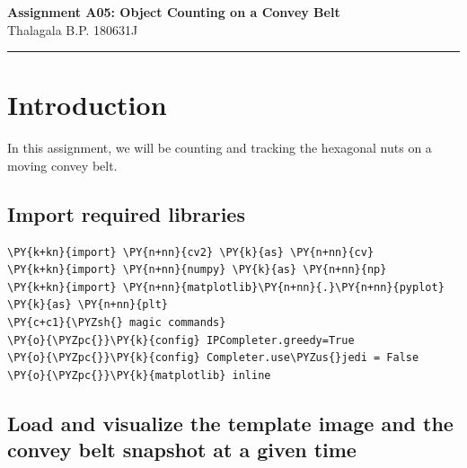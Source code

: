\documentclass[a4paper,11pt]{article}%
\begin{document}
	\begin{center}
		{\large \textbf{Assignment A05: Object Counting on a Convey Belt}}\\
		Thalagala B.P.\hspace{0.5cm} 180631J
	\end{center}
	\hrule


\section{Introduction}
In this assignment, we will be counting and tracking the hexagonal nuts
on a moving convey belt.

\hypertarget{lets-first-import-required-libraries}{%
\subsection{Import required libraries}\label{lets-first-import-required-libraries}}

    \begin{tcolorbox}[breakable, size=fbox, boxrule=1pt, pad at break*=1mm,colback=cellbackground, colframe=cellborder]
\begin{Verbatim}[commandchars=\\\{\}]
\PY{k+kn}{import} \PY{n+nn}{cv2} \PY{k}{as} \PY{n+nn}{cv}
\PY{k+kn}{import} \PY{n+nn}{numpy} \PY{k}{as} \PY{n+nn}{np}
\PY{k+kn}{import} \PY{n+nn}{matplotlib}\PY{n+nn}{.}\PY{n+nn}{pyplot} \PY{k}{as} \PY{n+nn}{plt}
\PY{c+c1}{\PYZsh{} magic commands}
\PY{o}{\PYZpc{}}\PY{k}{config} IPCompleter.greedy=True
\PY{o}{\PYZpc{}}\PY{k}{config} Completer.use\PYZus{}jedi = False
\PY{o}{\PYZpc{}}\PY{k}{matplotlib} inline
\end{Verbatim}
\end{tcolorbox}

    \hypertarget{lets-load-and-visualize-the-template-image-and-the-convey-belt-snapshot-at-a-given-time.}{%
\subsection{Load and visualize the template image and the
convey belt snapshot at a given
time}\label{lets-load-and-visualize-the-template-image-and-the-convey-belt-snapshot-at-a-given-time.}}
\end{document}
